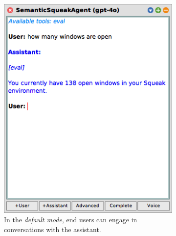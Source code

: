 \begin{figure}[t]
	\centering
    \begin{subfigure}[t]{0.5\dimexpr\textwidth-1em\relax}
        \centering
        \includegraphics[width=\textwidth]{03_tools/editor/default.png}
        \caption{In the \emph{default mode}, end users can engage in conversations with the assistant.}
        \label{fig:semtex/tools/editor/default}
    \end{subfigure}
    \hfill
    \begin{subfigure}[t]{0.5\dimexpr\textwidth-1em\relax}
        \centering

\end{subfigure}
\end{figure}
